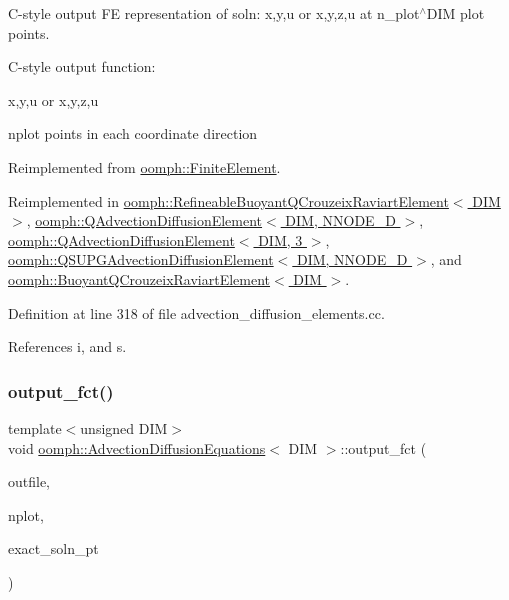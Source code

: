 C-\/style output FE representation of soln\+: x,y,u or x,y,z,u at n\+\_\+plot$^\wedge$\+D\+IM plot points. 

C-\/style output function\+:

x,y,u or x,y,z,u

nplot points in each coordinate direction 

Reimplemented from \hyperlink{classoomph_1_1FiniteElement_adfaee690bb0608f03320eeb9d110d48c}{oomph\+::\+Finite\+Element}.



Reimplemented in \hyperlink{classoomph_1_1RefineableBuoyantQCrouzeixRaviartElement_a650e1b0428cd160c72dbc3deda287b26}{oomph\+::\+Refineable\+Buoyant\+Q\+Crouzeix\+Raviart\+Element$<$ D\+I\+M $>$}, \hyperlink{classoomph_1_1QAdvectionDiffusionElement_a891cdaba60a0cd6b3438f161fb537933}{oomph\+::\+Q\+Advection\+Diffusion\+Element$<$ D\+I\+M, N\+N\+O\+D\+E\+\_\+D $>$}, \hyperlink{classoomph_1_1QAdvectionDiffusionElement_a891cdaba60a0cd6b3438f161fb537933}{oomph\+::\+Q\+Advection\+Diffusion\+Element$<$ D\+I\+M, 3 $>$}, \hyperlink{classoomph_1_1QSUPGAdvectionDiffusionElement_ac567806bf5318e95b1517cb80e8a3b78}{oomph\+::\+Q\+S\+U\+P\+G\+Advection\+Diffusion\+Element$<$ D\+I\+M, N\+N\+O\+D\+E\+\_\+D $>$}, and \hyperlink{classoomph_1_1BuoyantQCrouzeixRaviartElement_a48039bbb2f32897b70fb0858ff739516}{oomph\+::\+Buoyant\+Q\+Crouzeix\+Raviart\+Element$<$ D\+I\+M $>$}.



Definition at line 318 of file advection\+\_\+diffusion\+\_\+elements.\+cc.



References i, and s.

\mbox{\label{classoomph_1_1AdvectionDiffusionEquations_ab1d0f6bc8d3c9c9826ac1d71f1fd148f}} 
\subsubsection{\texorpdfstring{output\+\_\+fct()}{output\_fct()}\hspace{0.1cm}{\footnotesize\ttfamily [1/2]}}
{\footnotesize\ttfamily template$<$unsigned D\+IM$>$ \\
void \hyperlink{classoomph_1_1AdvectionDiffusionEquations}{oomph\+::\+Advection\+Diffusion\+Equations}$<$ D\+IM $>$\+::output\+\_\+fct (\begin{DoxyParamCaption}\item[{std\+::ostream \&}]{outfile,  }\item[{const unsigned \&}]{nplot,  }\item[{\hyperlink{classoomph_1_1FiniteElement_a690fd33af26cc3e84f39bba6d5a85202}{Finite\+Element\+::\+Steady\+Exact\+Solution\+Fct\+Pt}}]{exact\+\_\+soln\+\_\+pt }\end{DoxyParamCaption})\hspace{0.3cm}{\ttfamily [virtual]}}



